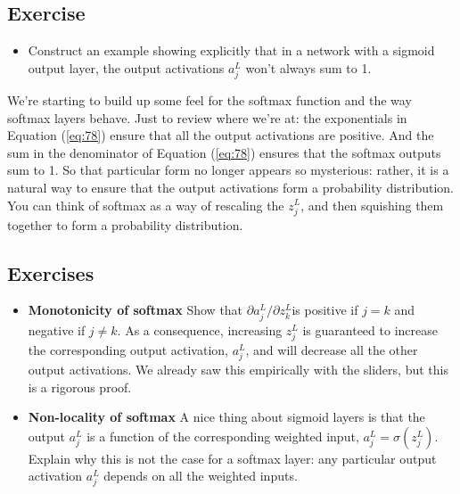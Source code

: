 \documentclass[a4paper,twoside,10pt]{book}
\begin{document}
\subsection*{Exercise}
\begin{itemize}
	\item Construct an example showing explicitly that in a network with a sigmoid output layer, the output activations $a^L_j$ won't always sum to 1.
\end{itemize}
We're starting to build up some feel for the softmax function and the way softmax layers behave. Just to review where we're at: the exponentials in Equation (\ref{eq:78}) ensure that all the output activations are positive. And the sum in the denominator of Equation (\ref{eq:78}) ensures that the softmax outputs sum to 1. So that particular form no longer appears so mysterious: rather, it is a natural way to ensure that the output activations form a probability distribution. You can think of softmax as a way of rescaling the $z^L_j$, and then squishing them together to form a probability distribution.

\subsection*{Exercises}
\begin{itemize}
\item \textbf{Monotonicity of softmax} Show that $\partial a^L_j / \partial z^L_k $is positive if $j=k$ and negative if $j\ne k$. As a consequence, increasing $z^L_j$ is guaranteed to increase the corresponding output activation, $a^L_j$, and will decrease all the other output activations. We already saw this empirically with the sliders, but this is a rigorous proof.
\item \textbf{Non-locality of softmax} A nice thing about sigmoid layers is that the output $a^L_j$ is a function of the corresponding weighted input, $a^L_j=\sigma(z^L_j)$. Explain why this is not the case for a softmax layer: any particular output activation $a^L_j$ depends on all the weighted inputs.
\end{itemize}
\end{document}
